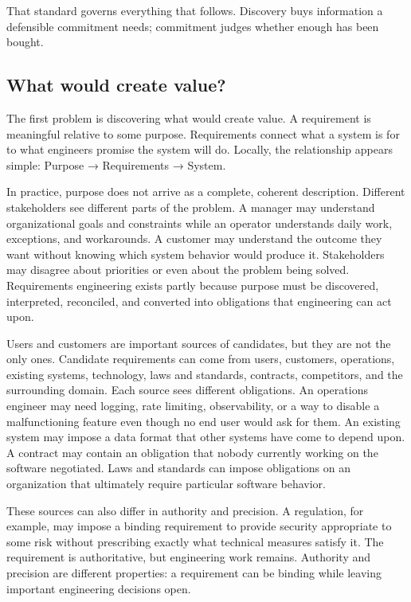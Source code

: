 That standard governs everything that follows. Discovery buys information a defensible
commitment needs; commitment judges whether enough has been bought.

\subsection{What would create value?}\label{sec-what-might-matter}

The first problem is discovering what would create value. A
requirement is meaningful relative to some purpose. Requirements connect what a system is for to
what engineers promise the system will do. Locally, the relationship appears simple: Purpose →
Requirements → System.

In practice, purpose does not arrive as a complete, coherent description. Different stakeholders see
different parts of the problem. A manager may understand organizational goals and constraints while
an operator understands daily work, exceptions, and workarounds. A customer may understand the
outcome they want without knowing which system behavior would produce it. Stakeholders may disagree
about priorities or even about the problem being solved. Requirements engineering exists partly
because purpose must be discovered, interpreted, reconciled, and converted into obligations that
engineering can act upon.

Users and customers are important sources of candidates, but they are not the only ones. Candidate
requirements can come from users, customers, operations, existing systems, technology, laws and
standards, contracts, competitors, and the surrounding domain. Each source sees different
obligations. An operations engineer may need logging, rate limiting, observability, or a way to
disable a malfunctioning feature even though no end user would ask for them. An existing system may
impose a data format that other systems have come to depend upon. A contract may contain an
obligation that nobody currently working on the software negotiated. Laws and standards can impose
obligations on an organization that ultimately require particular software behavior.

These sources can also differ in authority and precision. A regulation, for example, may impose a
binding requirement to provide security appropriate to some risk without prescribing exactly what
technical measures satisfy it. The requirement is authoritative, but engineering work remains.
Authority and precision are different properties: a requirement can be binding while leaving
important engineering decisions open.

